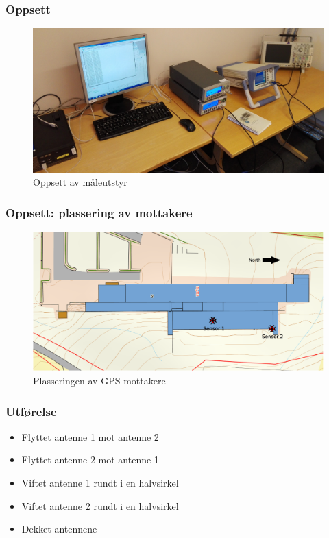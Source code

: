 \documentclass[xcolor=table]{beamer}
\begin{document}
\begin{frame}
\frametitle{Oppsett}
      \begin{figure}
        \includegraphics[scale=0.08]{thesis/graphics/lab_setup_cropped.jpg}
        \caption{Oppsett av måleutstyr}
      \end{figure}
\end{frame}

\begin{frame}
\frametitle{Oppsett: plassering av mottakere}
      \begin{figure}
        \includegraphics[scale=0.18]{thesis/graphics/roof.eps}
        \caption{Plasseringen av GPS mottakere}
      \end{figure}
\end{frame}

\begin{frame}
\frametitle{Utførelse}
      \begin{itemize}
            \setlength\itemsep{2em}
        \item Flyttet antenne 1 mot antenne 2
        \item Flyttet antenne 2 mot antenne 1
        \item Viftet antenne 1 rundt i en halvsirkel
        \item Viftet antenne 2 rundt i en halvsirkel
        \item Dekket antennene
      \end{itemize}
\end{frame}
\end{document}
